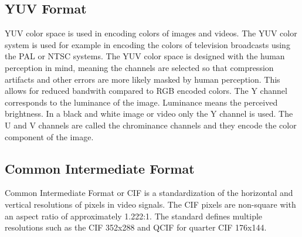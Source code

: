 \subsection{YUV Format}
\label{subsec:yuv}
YUV color space is used in encoding colors of images and videos. The YUV color system is used for example in encoding the colors of television broadcasts using the PAL or NTSC systems. The YUV color space is designed with the human perception in mind, meaning the channels are selected so that compression artifacts and other errors are more likely masked by human perception. This allows for reduced bandwith compared to RGB encoded colors. The Y channel corresponds to the luminance of the image. Luminance means the perceived brightness. In a black and white image or video only the Y channel is used. The U and V channels are called the chrominance channels and they encode the color component of the image.~\cite{jack2011video}


\subsection{Common Intermediate Format}
\label{subsec:cif}
Common Intermediate Format or CIF is a standardization of the horizontal and vertical resolutions of pixels in video signals. The CIF pixels are non-square with an aspect ratio of approximately 1.222:1. The standard defines multiple resolutions such as the CIF 352x288 and QCIF for quarter CIF 176x144.~\cite{telecommunication1993itu}

